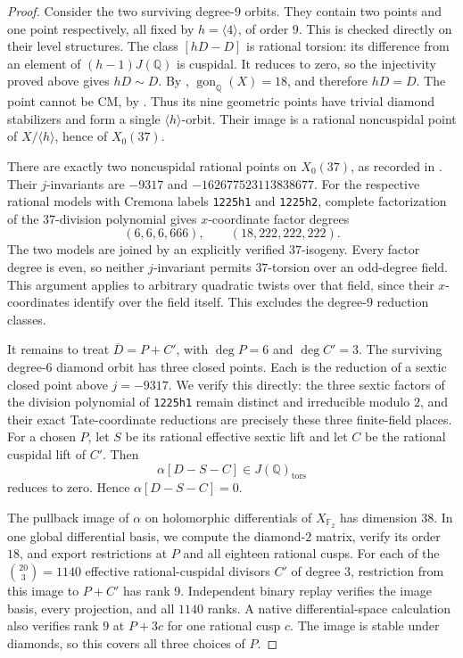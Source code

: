\begin{proof}
Consider the two surviving degree-$9$ orbits. They contain two
points and one point respectively, all fixed by $h=\langle4\rangle$,
of order $9$. This is checked directly on their level structures.
The class $[hD-D]$ is rational torsion: its difference from an element
of $(h-1)J(\mathbb Q)$ is cuspidal. It reduces to zero, so the
injectivity proved above gives $hD\sim D$.
By \cite[Theorem~1]{DvH}, $\operatorname{gon}_{\mathbb Q}(X)=18$,
and therefore $hD=D$.
The point cannot be CM, by \cite[Section~4.9]{CCRS}.
Thus its nine geometric points have trivial diamond stabilizers
and form a single $\langle h\rangle$-orbit. Their image is a
rational noncuspidal point of $X/\langle h\rangle$, hence of $X_0(37)$.

There are exactly two noncuspidal rational points on $X_0(37)$,
as recorded in \cite[p.~129]{MazurIsog}. Their $j$-invariants are
$-9317$ and $-162677523113838677$.
For the respective rational models with Cremona labels
\texttt{1225h1} and \texttt{1225h2}, complete factorization of the
$37$-division polynomial gives $x$-coordinate factor degrees
\[
 (6,6,6,666),\qquad(18,222,222,222).
\]
The two models are joined by an explicitly verified $37$-isogeny.
Every factor degree is even, so neither $j$-invariant permits
$37$-torsion over an odd-degree field. This argument applies to
arbitrary quadratic twists over that field, since their
$x$-coordinates identify over the field itself. This excludes
the degree-$9$ reduction classes.

It remains to treat $\overline D=P+C'$, with $\deg P=6$ and
$\deg C'=3$. The surviving degree-$6$ diamond orbit has three
closed points. Each is the reduction of a sextic closed point
above $j=-9317$. We verify this directly: the three sextic factors
of the division polynomial of \texttt{1225h1} remain distinct and
irreducible modulo $2$, and their exact Tate-coordinate reductions
are precisely these three finite-field places. For a chosen $P$,
let $S$ be its rational effective sextic lift and let $C$ be the
rational cuspidal lift of $C'$. Then
\[
 \alpha[D-S-C]\in J(\mathbb Q)_{\mathrm{tors}}
\]
reduces to zero. Hence $\alpha[D-S-C]=0$.

The pullback image of $\alpha$ on holomorphic differentials of
$X_{\mathbb F_2}$ has dimension $38$.
In one global differential basis, we compute the diamond-$2$
matrix, verify its order $18$, and export restrictions at $P$ and
all eighteen rational cusps. For each of the
$\binom{20}{3}=1140$ effective rational-cuspidal divisors $C'$ of
degree $3$, restriction from this image to $P+C'$ has rank $9$.
Independent binary replay verifies the image basis, every
projection, and all $1140$ ranks. A native differential-space
calculation also verifies rank $9$ at $P+3c$ for one rational cusp
$c$. The image is stable under diamonds, so this covers all three
choices of $P$.


\end{proof}
